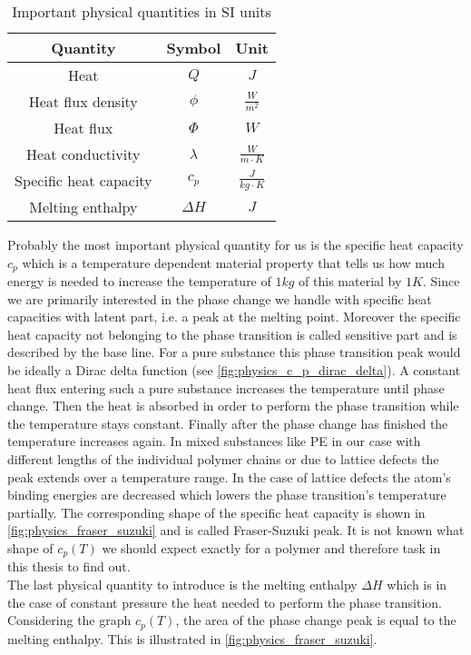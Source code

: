 \documentclass{scrartcl}[12pt, halfparskip]
\numberwithin{equation}{section}
\numberwithin{figure}{section}
\numberwithin{table}{section}
\begin{document}
\begin{table}[H]
	\centering
\begin{tabular}{| c | c | c |} \hline
	Quantity & Symbol & Unit \\ \hline
	Heat & $Q$ & $J$ \\[0.7ex]
	Heat flux density & $\phi$ & $\frac{W}{m^2}$ \\[0.7ex]
	Heat flux & $\varPhi$ & $W$ \\[0.7ex]
	Heat conductivity & $\lambda$ & $\frac{W}{m \cdot K}$ \\[0.7ex]
	Specific heat capacity & $c_p$ & $\frac{J}{kg \cdot K}$ \\[0.7ex]
	Melting enthalpy & $\Delta H$ & $J$ \\ \hline
\end{tabular}
\caption{Important physical quantities in SI units}
\label{tab:important_physical_quantities}
\end{table}



Probably the most important physical quantity for us is the specific heat capacity $c_p$ which is a temperature dependent material property that tells us how much energy is needed to increase the temperature of $1kg$ of this material by $1K$. 
Since we are primarily interested in the phase change we handle with specific heat capacities with latent part, i.e. a peak at the melting point. Moreover the specific heat capacity not belonging to the phase transition is called sensitive part and is described by the base line. 
For a pure substance this phase transition peak would be ideally a Dirac delta function (see  \cref{fig:physics_c_p_dirac_delta}). A constant heat flux entering such a pure substance increases the temperature until phase change. Then the heat is absorbed in order to perform the phase transition while the temperature stays constant. Finally after the phase change has finished the temperature increases again. 
In mixed substances like PE in our case with different lengths of the individual polymer chains or due to lattice defects the peak extends over a temperature range. In the case of lattice defects the atom's binding energies are decreased which lowers the phase transition's temperature partially. The corresponding shape of the specific heat capacity is shown in \cref{fig:physics_fraser_suzuki} and is called Fraser-Suzuki peak. It is not known what shape of $c_p(T)$ we should expect exactly for a polymer and therefore task in this thesis to find out. \\
The last physical quantity to introduce is the melting enthalpy $\Delta H$ which is in the case of constant pressure the heat needed to perform the phase transition. Considering the graph $c_p(T)$, the area of the phase change peak is equal to the melting enthalpy. This is illustrated in \cref{fig:physics_fraser_suzuki}.
\end{document}
